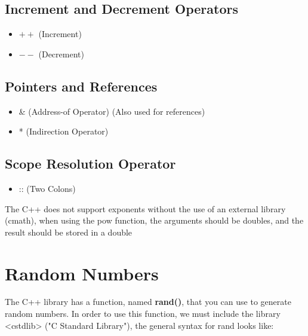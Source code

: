 \documentclass{report}
\begin{document}
    \begin{minipage}[t]{0.47\textwidth}
        \subsection{Increment and Decrement Operators}
        \begin{itemize}
          \item \( ++ \) (Increment)
          \item \( -- \) (Decrement)
        \end{itemize}
        \subsection{Pointers and References}
        \begin{itemize}
            \item \& (Address-of Operator) (Also used for references)
            \item * (Indirection Operator)
        \end{itemize}
    \end{minipage}
    \bigbreak \noindent 
    \begin{minipage}[]{0.47\textwidth}
        \subsection{Scope Resolution Operator}
        \begin{itemize}
            \item :: (Two Colons)
        \end{itemize}
    
    \end{minipage}


    \bigbreak \noindent 
    \begin{notebox}
			The C++ does not support exponents without the use of an external library (cmath), when using the pow function, the arguments should be doubles, and the result should be stored in a double
		\end{notebox}

    \pagebreak \bigbreak \noindent 
    \section{\LARGE Random Numbers}
    \bigbreak \noindent 
    The C++ library has a function, named \textbf{rand()}, that you can use to generate random numbers. In order to use this function, we must include the library <cstdlib> ("C Standard Library"), the general syntax for rand looks like:
    \smallbreak \noindent
    
\end{document}
